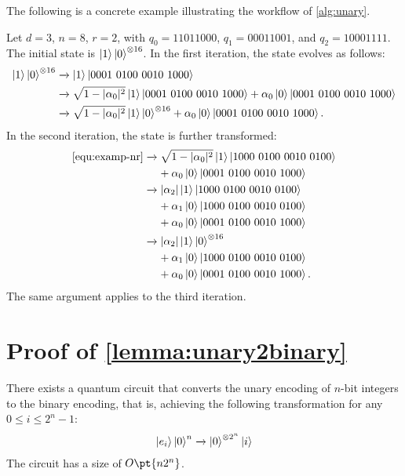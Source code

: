 \documentclass[a4paper,UKenglish,cleveref, autoref, thm-restate]{lipics-v2021}
\DeclarePairedDelimiter\abs{\lvert}{\rvert}
\newcommand{\bo}{O\pt}
\begin{document}
The following is a concrete example illustrating the workflow of \cref{alg:unary}.
\begin{example}
    Let $d = 3$, $n = 8$, $r = 2$, with $q_0 = 11011000$, $q_1 = 00011001$, and $q_2 = 10001111$. The initial state is $\ket{1} \ket{0}^{\otimes 16}$. In the first iteration, the state evolves as follows: 
    \begin{align}
        \ket{1}\ket{0}^{\otimes 16} 
        & \xrightarrow{} \ket{1} \ket{0001\ 0100\ 0010\ 1000} \\
        & \xrightarrow{} \sqrt{1-\abs{\alpha_0}^2} \ket{1} \ket{0001\ 0100\ 0010\ 1000} + \alpha_0 \ket{0}\ket{0001\ 0100\ 0010\ 1000}\\
        & \xrightarrow{} \sqrt{1-\abs{\alpha_0}^2} \ket{1} \ket{0}^{\otimes 16} + \alpha_0 \ket{0}\ket{0001\ 0100\ 0010\ 1000}.\label{equ:examp-nr}
    \end{align}
    In the second iteration, the state is further transformed:
    \begin{align}
    \cref{equ:examp-nr} 
    & \xrightarrow{} 
    \sqrt{1 - \abs{\alpha_0}^2} \ket{1} \ket{1000\ 0100\ 0010\ 0100} \notag \\
    & \phantom{\xrightarrow{}} 
    \ + \alpha_0 \ket{0} \ket{0001\ 0100\ 0010\ 1000} \\
    & \xrightarrow{} 
    \abs{\alpha_2} \ket{1} \ket{1000\ 0100\ 0010\ 0100} \notag \\
    & \phantom{\xrightarrow{}} 
    \ + \alpha_1 \ket{0} \ket{1000\ 0100\ 0010\ 0100} \notag \\
    & \phantom{\xrightarrow{}} 
    \ + \alpha_0 \ket{0} \ket{0001\ 0100\ 0010\ 1000} \\
    & \xrightarrow{} 
    \abs{\alpha_2} \ket{1} \ket{0}^{\otimes 16} \notag \\
    & \phantom{\xrightarrow{}} 
    \ + \alpha_1 \ket{0} \ket{1000\ 0100\ 0010\ 0100} \notag \\
    & \phantom{\xrightarrow{}} 
    \ + \alpha_0 \ket{0} \ket{0001\ 0100\ 0010\ 1000}.
\end{align}
The same argument applies to the third iteration.
\end{example}



\section{\texorpdfstring{Proof of \cref{lemma:unary2binary}}{Proof of Lemma 18}}\label{app:lemma-unary2binary}
\begin{lemma}
    There exists a quantum circuit that converts the unary encoding of $n$-bit integers to the binary encoding, that is, achieving the following transformation for any $0 \leq i \leq 2^n-1$:
    \begin{align}
        \ket{e_i}\ket{0}^n \xrightarrow{} \ket{0}^{\otimes 2^n} \ket{i}
    \end{align}
    The circuit has a size of $\bo{n2^n}$.
\end{lemma}
\end{document}
